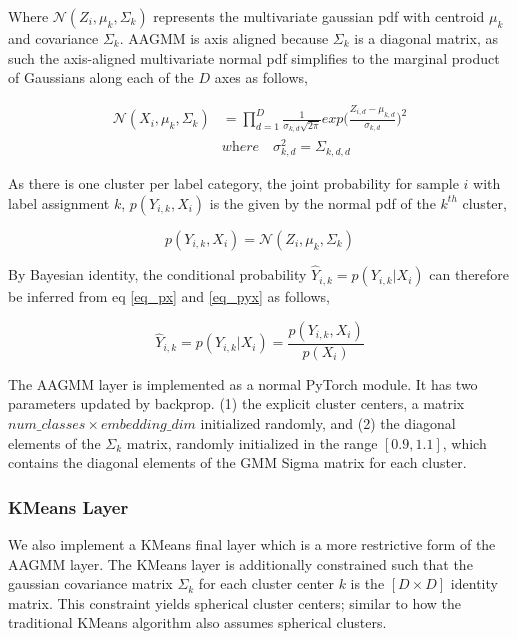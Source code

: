 \documentclass[10pt,twocolumn,letterpaper]{article}
\begin{document}
Where $\mathcal{N}(Z_i, \mu_k, \Sigma_k)$ represents the multivariate gaussian pdf with centroid $\mu_k$ and covariance $\Sigma_k$. 
AAGMM is axis aligned because $\Sigma_k$ is a diagonal matrix, as such the axis-aligned multivariate normal pdf simplifies to the marginal product of Gaussians along each of the $D$ axes as follows,

\begin{equation}
	\begin{aligned}
		\mathcal{N} (X_i, \mu_{k}, \Sigma_k) &=  \prod_{d=1}^D \frac{1}{\sigma_{k,d}\sqrt{2 \pi}} exp \Big( \frac{Z_{i,d} - \mu_{k,d}} {\sigma_{k,d}} \Big)^2 \\[10pt]
		&\textit{where} \quad \sigma^2_{k,d} = \Sigma_{k,d,d}
	\end{aligned}
\end{equation}

As there is one cluster per label category, the joint probability for sample $i$ with label assignment $k$, $p(Y_{i,k},X_i)$ is the given by the normal pdf of the $k^{th}$ cluster,

\begin{equation}
	\label{eq_pyx}
	p(Y_{i,k},X_i) = \mathcal{N} (Z_i, \mu_{k}, \Sigma_k) \end{equation}

By Bayesian identity, the conditional probability $\hat{Y}_{i,k}=p(Y_{i,k}|X_i)$ can therefore be inferred from eq \ref{eq_px} and \ref{eq_pyx} as follows,

\begin{equation}
	\hat{Y}_{i,k} = p(Y_{i,k}|X_i) = \frac{p(Y_{i,k}, X_i)}{p(X_i)}
\end{equation}

The AAGMM layer is implemented as a normal PyTorch \cite{pytorch} module.
It has two parameters updated by backprop.
(1) the explicit cluster centers, a matrix $num\_classes \times embedding\_dim$ initialized randomly, and
(2) the diagonal elements of the $\Sigma_k$ matrix, randomly initialized in the range $[0.9, 1.1]$, which contains the diagonal elements of the GMM Sigma matrix for each cluster.

\subsubsection{KMeans Layer}

We also implement a KMeans final layer which is a more restrictive form of the AAGMM layer.
The KMeans layer is additionally constrained such that the gaussian covariance matrix $\Sigma_k$ for each cluster center $k$ is the $[D \times D]$ identity matrix. 
This constraint yields spherical cluster centers; similar to how the traditional KMeans algorithm also assumes spherical clusters.
\end{document}
